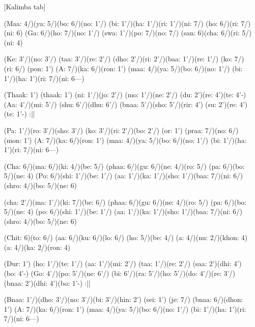 \documentclass[11pt]{article}
\begin{document}
[Kalimba tab]
\begin{jianpu}
(Maa: 4/)(ya: 5/)(bo: 6/)(no: 1'/) (bi: 1'/)(ha: 1'/)(ri: 1'/)(ni: 7/) (ho: 6/)(ri: 7/)(ni: 6)
(Ga: 6/)(ho: 7/)(no: 1'/) (swa: 1'/)(po: 7/)(no: 7/) (san: 6)(cha: 6/)(ri: 5/)(ni: 4)

(Ke: 3'/)(no: 3'/) (taa: 3'/)(re: 2'/) (dho: 2'/)(ri: 2'/)(baa: 1'/)(re: 1'/) (ko: 7/)(ri: 6/) (pon: 1')
(A: 7/)(ka: 6/)(ron: 1') (maa: 4/)(ya: 5/)(bo: 6/)(no: 1'/) (bi: 1'/)(ha: 1')(ri: 7/)(ni: 6---)

(Thaak: 1') (thaak: 1') (ni: 1'/)(jo: 2'/) (mo: 1'/)(ne: 2'/) (du: 2')(re: 4')(te: 4'-)
(Aa: 4'/)(mi: 5'/) (shu: 6'/)(dhu: 6'/) (bnaa: 5'/)(sho: 5'/)(rir: 4') (su: 2')(re: 4')(te: 1'-) :||

(Pa: 1'/)(ro: 3'/)(sho: 3'/) (ko: 3'/)(ri: 2'/)(bo: 2'/) (or: 1') (praa: 7/)(no: 6/)(mon: 1')
(A: 7/)(ka: 6/)(ron: 1') (maa: 4/)(ya: 5/)(bo: 6/)(no: 1'/) (bi: 1'/)(ha: 1')(ri: 7/)(ni: 6---)

(Cha: 6/)(ma: 6/)(ki: 4/)(be: 5/) (phaa: 6/)(gu: 6/)(ne: 4/)(ro: 5/) (pa: 6/)(bo: 5/)(ne: 4)
(Po: 6/)(shi: 1'/)(be: 1'/) (aa: 1'/)(ka: 1'/)(sho: 1'/)(baa: 7/)(ni: 6/) (shro: 4/)(bo: 5/)(ne: 6)

(cha: 2'/)(ma: 1'/)(ki: 7/)(be: 6/) (phaa: 6/)(gu: 6/)(ne: 4/)(ro: 5/) (pa: 6/)(bo: 5/)(ne: 4)
(po: 6/)(shi: 1'/)(be: 1'/) (aa: 1'/)(ka: 1'/)(sho: 1'/)(baa: 7/)(ni: 6/) (shro: 4/)(bo: 5/)(ne: 6)

(Chit: 6)(to: 6/) (aa: 6/)(ku: 6/)(lo: 6/) (ho: 5/)(be: 4/) (a: 4/)(nu: 2/)(khon: 4) (a: 4/)(ka: 2/)(ron: 4)

(Dur: 1') (ho: 1'/)(te: 1'/) (aa: 1'/)(mi: 2'/) (taa: 1'/)(re: 2'/) (saa: 2')(dhi: 4')(bo: 4'-)
(Go: 4'/)(po: 5'/)(ne: 6'/) (bi: 6'/)(ra: 5'/)(ho: 5'/)(do: 4'/)(re: 3'/) (bnaa: 2')(dhi: 4')(bo: 1'-) :||

(Bnaa: 1'/)(dho: 3'/)(no: 3'/)(bi: 3'/)(hin: 2') (sei: 1') (je: 7/) (bnaa: 6/)(dhon: 1')
(A: 7/)(ka: 6/)(ron: 1') (maa: 4/)(ya: 5/)(bo: 6/)(no: 1'/) (bi: 1'/)(ha: 1')(ri: 7/)(ni: 6---)
\end{jianpu}
\end{document}
